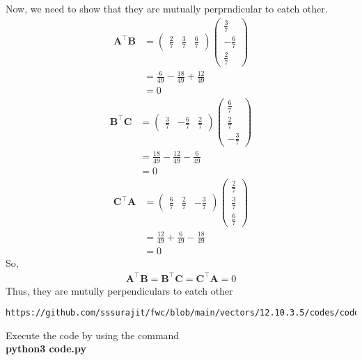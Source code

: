 \documentclass[journal,12pt,twocolumn]{IEEEtran}
\newcommand{\myvec}[1]{\ensuremath{\begin{pmatrix}#1\end{pmatrix}}}
\let\vec\mathbf
\begin{document}
Now, we need to show that they are mutually perprndicular to eatch other.
\begin{align}
\vec{A}^{\top}\vec{B}&=\myvec{\frac{2}{7}&\frac{3}{7}&\frac{6}{7}}\myvec{\frac{3}{7}\\-\frac{6}{7}\\ \frac{2}{7}}\\
&=\frac{6}{49}-\frac{18}{49}+\frac{12}{49}\\
&=0
\end{align}
\begin{align}
\vec{B}^{\top}\vec{C}&=\myvec{\frac{3}{7}&-\frac{6}{7}&\frac{2}{7}}\myvec{\frac{6}{7}\\ \frac{2}{7}\\-\frac{3}{7}}\\
&=\frac{18}{49}-\frac{12}{49}-\frac{6}{49}\\
&=0
\end{align}
\begin{align}
\vec{C}^{\top}\vec{A}&=\myvec{\frac{6}{7}&\frac{2}{7}&-\frac{3}{7}}\myvec{\frac{2}{7}\\ \frac{3}{7}\\ \frac{6}{7}}\\
&=\frac{12}{49}+\frac{6}{49}-\frac{18}{49}\\
&=0
\end{align}
So,\begin{align}
    \vec{A}^{\top}\vec{B}=\vec{B}^{\top}\vec{C}=\vec{C}^{\top}\vec{A}=0
\end{align}
Thus, they are mutully perpendiculars to eatch other
\begin{lstlisting}
https://github.com/sssurajit/fwc/blob/main/vectors/12.10.3.5/codes/code.py
\end{lstlisting}
Execute the code by using the command\\
\textbf{python3 code.py}
\end{document}
